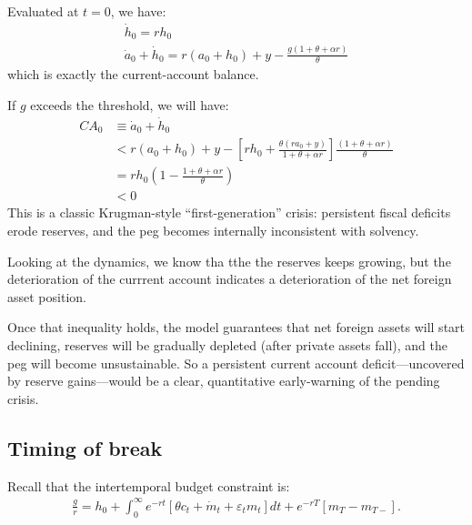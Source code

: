 \documentclass[a4paper,12pt]{article} %
\theoremstyle{nonitalic}
\begin{document}
Evaluated at $t=0$, we have:
\begin{gather*}
    \dot{h}_0 = r h_ 0 \\
    \dot{a}_0 + \dot{h}_0 = r (a_0 + h_0) + y - \frac{g (1 + \theta + \alpha r)}{\theta}
\end{gather*}
which is exactly the current-account balance. 

If $g$ exceeds the threshold, we will have:
\begin{align*}
    CA_0 & \equiv \dot{a}_0 + \dot{h}_0 \\
    &< r(a_0 + h_0) + y -  \left[ r h_0 + \frac{\theta (r a_0 + y)}{1 + \theta + \alpha r} \right] \frac{(1 + \theta + \alpha r)}{\theta} \\
    &= r h_0 \left(1 - \frac{1 + \theta + \alpha r}{\theta}\right) \\
    &< 0
\end{align*}
This is a classic Krugman-style ``first-generation'' crisis: persistent fiscal deficits erode reserves,
and the peg becomes internally inconsistent with solvency.

Looking at the dynamics, we know tha tthe the reserves keeps growing, but the deterioration of the currrent account
indicates a deterioration of the net foreign asset position.

Once that inequality holds, the model guarantees that net foreign assets will start declining,
reserves will be gradually depleted (after private assets fall), and the peg will become unsustainable.
So a persistent current account deficit—uncovered by reserve gains—would be a clear,
quantitative early-warning of the pending crisis.

\subsection{Timing of break}\label{sec:1.5}
Recall that the intertemporal budget constraint is:
\begin{gather*}
    \frac{g}{r} = h_0 + \int_0^{\infty} e^{-rt} \left[  \theta c_t + \dot{m}_t + \varepsilon_t m_t \right] dt + e^{-rT} \left[ m_T - m_{T-} \right].
\end{gather*}
\end{document}
